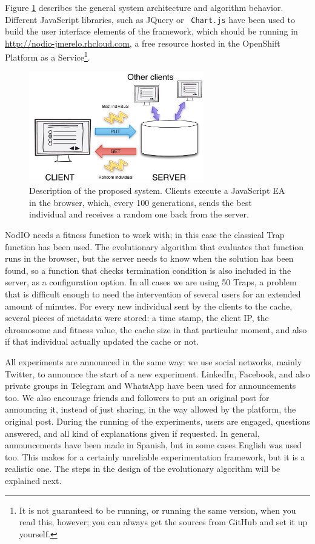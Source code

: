 \documentclass[runningheads,a4paper]{llncs}\usepackage[]{graphicx}\usepackage[]{color}
\begin{document}
Figure \ref{fig:system} describes the general system architecture and
algorithm behavior. Different JavaScript libraries, such as JQuery or {\tt
  Chart.js} have been used to build the user interface elements of the
framework, which should be running in
\url{http://nodio-jmerelo.rhcloud.com}, a free resource hosted in the
OpenShift Platform as a Service\footnote{It is not guaranteed to be running,
or running the same version, when you read this, however; you can always get
the sources from GitHub and set it up yourself.}.
%
\begin{figure}[!t]
\centering
\includegraphics[width=3in]{system.pdf}
\caption{Description of the proposed system. Clients execute a JavaScript EA
  in the browser, which, every 100 generations, sends the best
  individual and receives a random one back from the server.}
\label{fig:system}
\end{figure}

NodIO needs a fitness function to work with; in this case the classical Trap 
function \cite{Ackley1987} has been used. %
The evolutionary algorithm that evaluates that function runs in the
browser, but the server needs to know when the solution has been
found, so a function that checks termination condition is also included in the server, as a configuration
option. In all cases we are using 50 Traps, a problem
that is difficult enough to need the intervention of several users for
an extended amount of minutes.
For every new individual sent by the clients to the cache, several
pieces of metadata were stored: a time stamp, the client IP, the chromosome and
fitness value, the cache size in that particular moment, and also if that
individual actually updated the cache or not. 

All experiments are announced in the same way: we use social networks,
mainly Twitter, to announce the start of a new experiment. LinkedIn,
Facebook, and also private groups in Telegram and WhatsApp have been
used for announcements too. We also encourage friends and followers to
put an original post for announcing it, instead of just sharing, in
the way allowed by the platform, the original post. During the running
of the experiments, users are engaged, questions answered, and all
kind of explanations given if requested. In general, announcements
have been made in Spanish, but in some cases English was used
too. This makes for a certainly unreliable experimentation framework,
but it is a realistic one. The steps in the design of the evolutionary
algorithm will be explained next.
\end{document}
